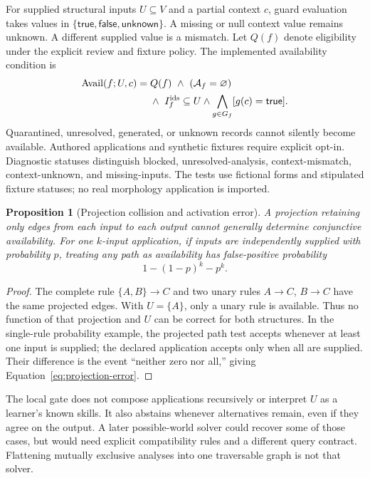 \documentclass{article}
\newtheorem{proposition}{Proposition}
\begin{document}
For supplied structural inputs $U\subseteq V$ and a partial context $c$, guard evaluation takes values in $\{\mathsf{true},\mathsf{false},\mathsf{unknown}\}$. A missing or null context value remains unknown. A different supplied value is a mismatch. Let $Q(f)$ denote eligibility under the explicit review and fixture policy. The implemented availability condition is
\begin{equation}
\begin{split}
 \operatorname{Avail}(f;U,c)={}&Q(f)\ \land\ (\mathcal{A}_f=\varnothing)\\
 &\land\ I_f^{\rm ids}\subseteq U
 \land\bigwedge_{g\in G_f}[g(c)=\mathsf{true}].
\end{split}
\label{eq:availability}
\end{equation}
Quarantined, unresolved, generated, or unknown records cannot silently become available. Authored applications and synthetic fixtures require explicit opt-in. Diagnostic statuses distinguish blocked, unresolved-analysis, context-mismatch, context-unknown, and missing-inputs. The tests use fictional forms and stipulated fixture statuses; no real morphology application is imported.

\begin{proposition}[Projection collision and activation error]
A projection retaining only edges from each input to each output cannot generally determine conjunctive availability. For one $k$-input application, if inputs are independently supplied with probability $p$, treating any path as availability has false-positive probability
\begin{equation}
 1-(1-p)^k-p^k.
\label{eq:projection-error}
\end{equation}
\end{proposition}
\begin{proof}
The complete rule $\{A,B\}\!\to\!C$ and two unary rules $A\!\to\!C$, $B\!\to\!C$ have the same projected edges. With $U=\{A\}$, only a unary rule is available. Thus no function of that projection and $U$ can be correct for both structures. In the single-rule probability example, the projected path test accepts whenever at least one input is supplied; the declared application accepts only when all are supplied. Their difference is the event ``neither zero nor all,'' giving Equation~\ref{eq:projection-error}.
\end{proof}

The local gate does not compose applications recursively or interpret $U$ as a learner's known skills. It also abstains whenever alternatives remain, even if they agree on the output. A later possible-world solver could recover some of those cases, but would need explicit compatibility rules and a different query contract. Flattening mutually exclusive analyses into one traversable graph is not that solver.
\end{document}
